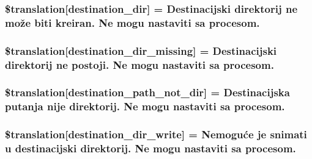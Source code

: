 \subsubsection[{\$translation}]{\setlength{\rightskip}{0pt plus 5cm}\$translation\mbox{[}\textquotesingle{}destination\+\_\+dir\textquotesingle{}\mbox{]} = \textquotesingle{}Destinacijski direktorij ne može biti kreiran. Ne mogu nastaviti sa procesom.\textquotesingle{}}\label{class_8upload_8hr___h_r_8php_aff2427c72a2598aefa6d58df1dd18b08}
\hypertarget{class_8upload_8hr___h_r_8php_a9ef28d3cf09942c6c0a1e77fa09185e8}{}
\subsubsection[{\$translation}]{\setlength{\rightskip}{0pt plus 5cm}\$translation\mbox{[}\textquotesingle{}destination\+\_\+dir\+\_\+missing\textquotesingle{}\mbox{]} = \textquotesingle{}Destinacijski direktorij ne postoji. Ne mogu nastaviti sa procesom.\textquotesingle{}}\label{class_8upload_8hr___h_r_8php_a9ef28d3cf09942c6c0a1e77fa09185e8}
\hypertarget{class_8upload_8hr___h_r_8php_a5704a67137126e8c87b7a364175929d4}{}
\subsubsection[{\$translation}]{\setlength{\rightskip}{0pt plus 5cm}\$translation\mbox{[}\textquotesingle{}destination\+\_\+path\+\_\+not\+\_\+dir\textquotesingle{}\mbox{]} = \textquotesingle{}Destinacijska putanja nije direktorij. Ne mogu nastaviti sa procesom.\textquotesingle{}}\label{class_8upload_8hr___h_r_8php_a5704a67137126e8c87b7a364175929d4}
\hypertarget{class_8upload_8hr___h_r_8php_a97608ea194a616db49141a0e6dee900c}{}
\subsubsection[{\$translation}]{\setlength{\rightskip}{0pt plus 5cm}\$translation\mbox{[}\textquotesingle{}destination\+\_\+dir\+\_\+write\textquotesingle{}\mbox{]} = \textquotesingle{}Nemoguće je snimati u destinacijski direktorij. Ne mogu nastaviti sa procesom.\textquotesingle{}}\label{class_8upload_8hr___h_r_8php_a97608ea194a616db49141a0e6dee900c}
\hypertarget{class_8upload_8hr___h_r_8php_a40e4e1962226b89fd76da5819a9602b0}{}
